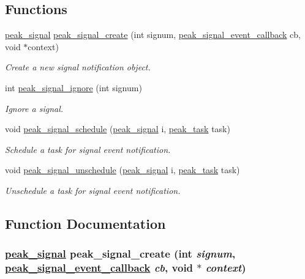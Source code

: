 \subsection*{Functions}
\begin{CompactItemize}
\item 
\hyperlink{group__signal_ga0}{peak\_\-signal} \hyperlink{group__signal_ga2}{peak\_\-signal\_\-create} (int signum, \hyperlink{group__signal_ga1}{peak\_\-signal\_\-event\_\-callback} cb, void $\ast$context)
\begin{CompactList}\small\item\em Create a new signal notification object. \item\end{CompactList}\item 
int \hyperlink{group__signal_ga3}{peak\_\-signal\_\-ignore} (int signum)
\begin{CompactList}\small\item\em Ignore a signal. \item\end{CompactList}\item 
void \hyperlink{group__signal_ga4}{peak\_\-signal\_\-schedule} (\hyperlink{group__signal_ga0}{peak\_\-signal} i, \hyperlink{group__task__common_ga0}{peak\_\-task} task)
\begin{CompactList}\small\item\em Schedule a task for signal event notification. \item\end{CompactList}\item 
void \hyperlink{group__signal_ga5}{peak\_\-signal\_\-unschedule} (\hyperlink{group__signal_ga0}{peak\_\-signal} i, \hyperlink{group__task__common_ga0}{peak\_\-task} task)
\begin{CompactList}\small\item\em Unschedule a task for signal event notification. \item\end{CompactList}\end{CompactItemize}


\subsection{Function Documentation}
\hypertarget{group__signal_ga2}{
\subsubsection[peak\_\-signal\_\-create]{\setlength{\rightskip}{0pt plus 5cm}\hyperlink{group__signal_ga0}{peak\_\-signal} peak\_\-signal\_\-create (int {\em signum}, \hyperlink{group__signal_ga1}{peak\_\-signal\_\-event\_\-callback} {\em cb}, void $\ast$ {\em context})}}
\label{group__signal_ga2}


